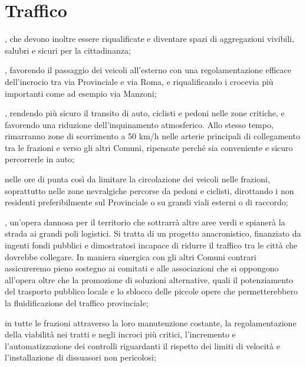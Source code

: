 \section{Traffico}
, che devono inoltre essere riqualificate e diventare spazi di aggregazioni vivibili, salubri e sicuri per la cittadinanza;

, favorendo il passaggio dei veicoli all'esterno con una regolamentazione efficace dell'incrocio tra via Provinciale e via Roma, e riqualificando i crocevia più importanti come ad esempio via Manzoni;

, rendendo più sicuro il transito di auto, ciclisti e pedoni nelle zone critiche, e favorendo una riduzione dell'inquinamento atmosferico. Allo stesso tempo, rimarranno zone di scorrimento a 50 km/h nelle arterie principali di collegamento tra le frazioni e verso gli altri Comuni, ripensate perché sia conveniente e sicuro percorrerle in auto; 

 nelle ore di punta così da limitare la circolazione dei veicoli nelle frazioni, soprattutto nelle zone nevralgiche percorse da pedoni e ciclisti, dirottando i non residenti preferibilmente sul Provinciale o su grandi viali esterni o di raccordo;

, un'opera dannosa per il territorio che sottrarrà altre aree verdi e spianerà la strada ai grandi poli logistici. Si tratta di un progetto anacronistico, finanziato da ingenti fondi pubblici e dimostratosi incapace di ridurre il traffico tra le città che dovrebbe collegare. In maniera sinergica con gli altri Comuni contrari assicureremo pieno sostegno ai comitati e alle associazioni che si oppongono all'opera oltre che la promozione di soluzioni alternative, quali il potenziamento del trasporto pubblico locale e lo sblocco delle piccole opere che permetterebbero la fluidificazione del traffico provinciale;

 in tutte le frazioni attraverso la loro manutenzione costante, la regolamentazione della viabilità nei tratti e negli incroci più critici, l'incremento e l'automatizzazione dei controlli riguardanti il rispetto dei limiti di velocità e l'installazione di dissuasori non pericolosi;

